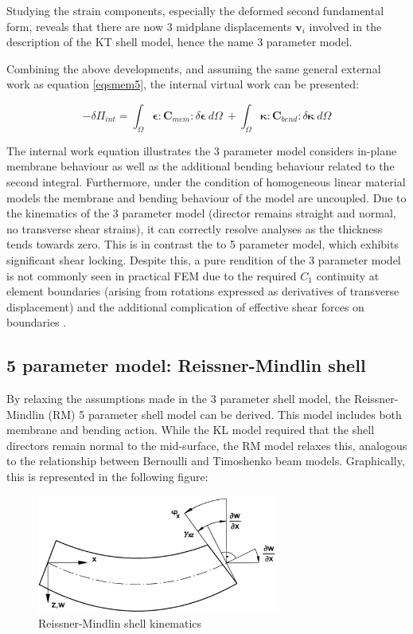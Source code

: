 Studying the strain components, especially the deformed second fundamental form, reveals that there are now 3 midplane displacements $\mathbf{v}_i$ involved in the description of the KT shell model, hence the name 3 parameter model.

Combining the above developments, and assuming the same general external work as equation \eqref{eqsmem5}, the internal virtual work can be presented:

\begin{equation} 
-\delta\Pi_{int} = 
\int_\Omega
\boldsymbol{\epsilon}
:
\mathbf{C}_{mem}
:
\delta \boldsymbol{\epsilon}\ d \Omega\ 
+
\int_\Omega
\boldsymbol{\kappa}
:
\mathbf{C}_{bend}
:
\delta \boldsymbol{\kappa}\ 
d \Omega
\label{eqskt9}
\end{equation}

The internal work equation illustrates the 3 parameter model considers in-plane membrane behaviour as well as the additional bending behaviour related to the second integral. Furthermore, under the condition of homogeneous linear material models the membrane and bending behaviour of the model are uncoupled. Due to the kinematics of the 3 parameter model (director remains straight and normal, no transverse shear strains), it can correctly resolve analyses as the thickness tends towards zero. This is in contrast the to 5 parameter model, which exhibits significant shear locking. Despite this, a pure rendition of the 3 parameter model is not commonly seen in practical FEM due to the required $C_1$ continuity at element boundaries (arising from rotations expressed as derivatives of transverse displacement) and the additional complication of effective shear forces on boundaries \cite{BischLitBook04}.


\subsection{5 parameter model: Reissner-Mindlin shell}

By relaxing the assumptions made in the 3 parameter shell model, the Reissner-Mindlin (RM) 5 parameter shell model can be derived. This model includes both membrane and bending action. While the KL model required that the shell directors remain normal to the mid-surface, the RM model relaxes this, analogous to the relationship between Bernoulli and Timoshenko beam models. Graphically, this is represented in the following figure:

\begin{figure}[H]
	\centering
	\def\svgwidth{\columnwidth}
	\includegraphics[width=8cm]{images/timoshenkobeam.png}
	\caption{Reissner-Mindlin shell kinematics \cite{Bletz16}}
	\label{thickshellkine1}
\end{figure}


